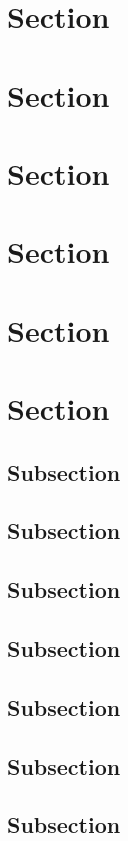 \documentclass[paper=a5,twoside,fontsize=10pt, DIV=calc, headings=small,bibliography=totoc, listof=totoc]{scrbook}
\begin{document}
\section{Section}

\section{Section}

\section{Section}

\section{Section}

\section{Section}

\section{Section}

\subsection{Subsection}
\blindtext

\subsection{Subsection}
\subsection{Subsection}
\subsection{Subsection}
\subsection{Subsection}
\subsection{Subsection}
\subsection{Subsection}
\end{document}
